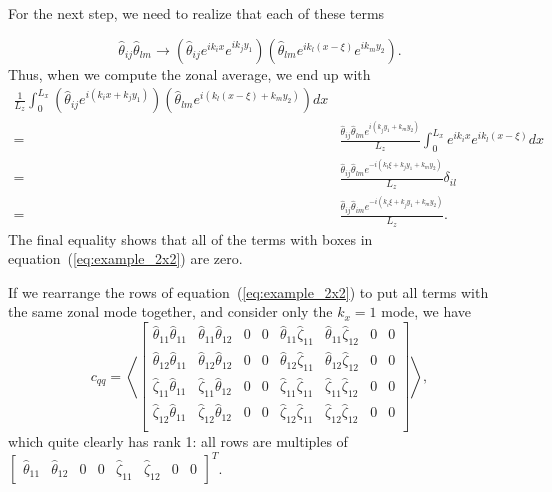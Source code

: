 \documentclass[11pt]{article}
\newcommand{\htt}{\hat{\theta}}
\newcommand{\htz}{\hat{\zeta}}
\begin{document}
For the next step, we need to realize that each of these terms 

\begin{equation}
  \label{eq:hathat_eqn}
  \htt_{ij} \htt_{lm} \to \left(\htt_{ij} e^{i k_i x} e^{i k_j y_1}\right) \left(\htt_{lm}  e^{i k_l (x - \xi)} e^{i k_m y_2}\right).
\end{equation}
Thus, when we compute the zonal average, we end up with
\begin{align}
  \label{eq:zonal_hathat}
  \frac{1}{L_z} \int_0^{L_x} \left(\htt_{ij} e^{i (k_i x + k_j y_1)}\right) \left(\htt_{lm}  e^{i (k_l (x - \xi) + k_m y_2)}\right) dx & \\
  = &\frac{\htt_{ij}\htt_{lm} e^{i (k_j y_1 + k_m y_2)}}{L_z} \int_0^{L_x} e^{i k_i x} e^{i k_l (x - \xi)} dx\\
  = & \frac{\htt_{ij}\htt_{lm} e^{-i (k_l \xi + k_j y_1 + k_m y_2)}}{L_z} \delta_{il}\\
  = & \frac{\htt_{ij}\htt_{im} e^{-i (k_i \xi + k_j y_1 + k_m y_2)}}{L_z}.
\end{align}
The final equality shows that all of the terms with boxes in equation~(\ref{eq:example_2x2}) are zero.

If we rearrange the rows of equation~(\ref{eq:example_2x2}) to put all terms with the same zonal mode together, and consider only the $k_x = 1$ mode, we have
\begin{equation}
  \label{eq:final_example}
  c_{q q} = \left<
    \begin{bmatrix}
    \htt_{11} \htt_{11} & \htt_{11} \htt_{12} & 0 & 0 & \htt_{11} \htz_{11} & \htt_{11} \htz_{12} & 0 & 0\\
    \htt_{12} \htt_{11} & \htt_{12} \htt_{12} & 0 & 0 & \htt_{12} \htz_{11} & \htt_{12} \htz_{12} & 0 & 0\\
    \htz_{11} \htt_{11} & \htz_{11} \htt_{12} & 0 & 0 & \htz_{11} \htz_{11} & \htz_{11} \htz_{12} & 0 & 0\\
    \htz_{12} \htt_{11} & \htz_{12} \htt_{12} & 0 & 0 & \htz_{12} \htz_{11} & \htz_{12} \htz_{12} & 0 & 0\\
  \end{bmatrix}
  \right>,
\end{equation}
which quite clearly has rank 1: all rows are multiples of $\begin{bmatrix} \htt_{11} & \htt_{12} & 0 & 0 & \htz_{11} & \htz_{12} & 0 & 0\end{bmatrix}^T$.
\end{document}

